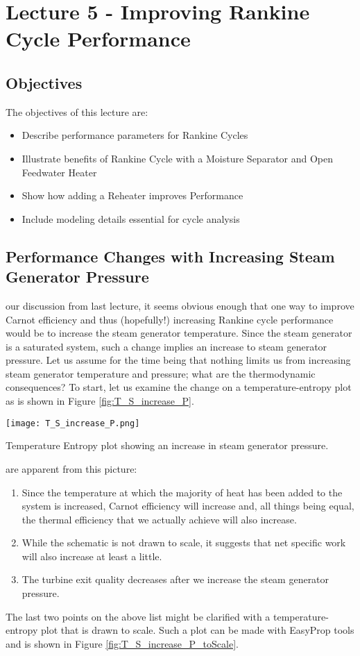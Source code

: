 \chapter{Lecture 5 - Improving Rankine Cycle Performance}
\label{ch:ch5}
\section{Objectives}
The objectives of this lecture are:
\begin{itemize}
\item Describe performance parameters for Rankine Cycles
\item Illustrate benefits of Rankine Cycle with a Moisture Separator and Open Feedwater Heater
\item Show how adding a Reheater improves Performance
\item Include modeling details essential for cycle analysis
\end{itemize}

\section{Performance Changes with Increasing Steam Generator Pressure}

 our discussion from last lecture, it seems obvious enough that one way to improve Carnot efficiency and thus (hopefully!) increasing Rankine cycle performance would be to increase the steam generator temperature.  Since the steam generator is a saturated system, such a change implies an increase to steam generator pressure.  Let us assume for the time being that nothing limits us from increasing steam generator temperature and pressure; what are the thermodynamic consequences?  To start, let us examine the change on a temperature-entropy plot as is shown in Figure \ref{fig:T_S_increase_P}.

\begin{marginfigure}
\texttt{[image: T\_S\_increase\_P.png]}
\caption{Temperature Entropy plot showing an increase in steam generator pressure.}
\label{fig:T_S_increase_P}
\end{marginfigure}

 are apparent from this picture:
\begin{enumerate}
\item Since the temperature at which the majority of heat has been added to the system is increased, Carnot efficiency will increase and, all things being equal, the thermal efficiency that we actually achieve will also increase.
\item While the schematic is not drawn to scale, it suggests that net specific work will also increase at least a little. 
\item The turbine exit quality decreases after we increase the steam generator pressure.   

\end{enumerate}
The last two points on the above list might be clarified with a temperature-entropy plot that is drawn to scale.  Such a plot can be made with EasyProp tools and is shown in Figure \ref{fig:T_S_increase_P_toScale}.

